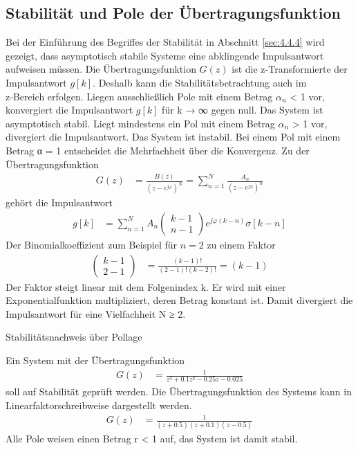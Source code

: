 \subsection{Stabilität und Pole der Übertragungsfunktion}\label{sec:6.3.11}

Bei der Einführung des Begriffes der Stabilität in Abschnitt \ref{sec:4.4.4} wird gezeigt, dass asymptotisch stabile Systeme eine abklingende Impulsantwort aufweisen müssen. Die Übertragungsfunktion \(G(z)\) ist die z-Transformierte der Impulsantwort \(g[k]\). Deshalb kann die Stabilitätsbetrachtung auch im\\
z-Bereich erfolgen. Liegen ausschließlich Pole mit einem Betrag \textbar \(α_{n}\)\textbar{} \textless{} 1 vor, konvergiert die Impulsantwort \(g[k]\) für k → ∞ gegen null. Das System ist asymptotisch stabil. Liegt mindestens ein Pol mit einem Betrag \textbar \(α_{n}\)\textbar{} \textgreater{} 1 vor, divergiert die Impulsantwort. Das System ist instabil. Bei einem Pol mit einem Betrag \textbar α\textbar{} = 1 entscheidet die Mehrfachheit über die Konvergenz. Zu der Übertragungsfunktion
\begin{align}
G(z) &= \frac{B(z)}{\left( z - e^{j  \varphi} \right)^{N}} = \sum\limits_{n = 1}^{N}\frac{A_{n}}{\left( z - e^{j  \varphi} \right)^{n}} \label{eq:6.115}
\end{align}
gehört die Impulsantwort
\begin{align}
g[ k] &= \sum\limits_{n = 1}^{N}{A_{n}  \left( \begin{array}{r}
k - 1 \\
n - 1
\end{array} \right)  e^{j  \varphi  (k - n)}  \sigma[ k - n]} \label{eq:6.116}
\end{align}
Der Binomialkoeffizient zum Beispiel für \(n = 2\) zu einem Faktor
\begin{align}
\left( \begin{array}{r}
k - 1 \\
2 - 1
\end{array} \right) &= \frac{(k - 1)!}{(2 - 1)!  (k - 2)!} = (k - 1) \label{eq:6.117}
\end{align}
Der Faktor steigt linear mit dem Folgenindex k. Er wird mit einer Exponentialfunktion multipliziert, deren Betrag konstant ist. Damit divergiert die Impulsantwort für eine Vielfachheit N ≥ 2.

\begin{example}{Stabilitätsnachweis über Pollage}
\label{example:beispiel-stabilituxe4tsnachweis-uxfcber-pollage}

Ein System mit der Übertragungsfunktion
\begin{align*}
G(z) &= \frac{1}{z^{3} + 0.1  z^{2} - 0.25  z - 0.025} 
\end{align*}
soll auf Stabilität geprüft werden. Die Übertragungsfunktion des Systems kann in Linearfaktorschreibweise dargestellt werden.
\begin{align*}
G(z) &= \frac{1}{(z + 0.5)  (z + 0.1)  (z - 0.5)} 
\end{align*}
Alle Pole weisen einen Betrag r \textless{} 1 auf, das System ist damit stabil.

\end{example}

